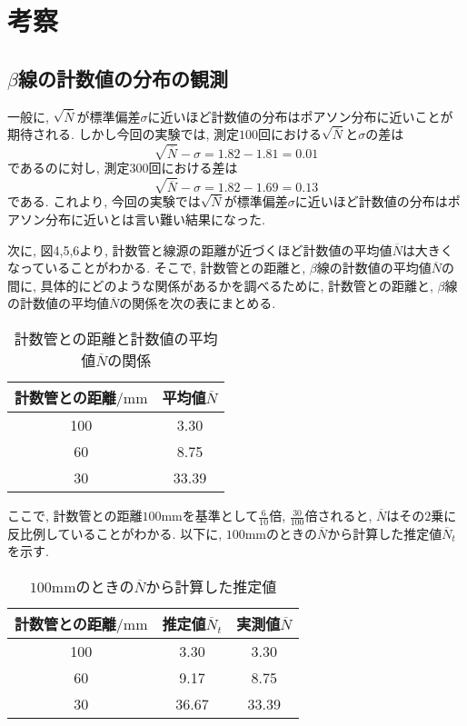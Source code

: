 \documentclass{jarticle}
\begin{document}
\section{考察}


\subsection{$\beta$線の計数値の分布の観測}

一般に, $\sqrt{\overline{N}}$が標準偏差$\sigma$に近いほど計数値の分布はポアソン分布に近いことが期待される.
しかし今回の実験では, 測定$100$回における$\sqrt{\overline{N}}$と$\sigma$の差は
\begin{equation}
  \sqrt{\overline{N}} - \sigma = 1.82 - 1.81 = 0.01
\end{equation}
であるのに対し, 測定$300$回における差は
\begin{equation}
  \sqrt{\overline{N}} - \sigma = 1.82 - 1.69 = 0.13
\end{equation}
である.
これより, 今回の実験では$\sqrt{\overline{N}}$が標準偏差$\sigma$に近いほど計数値の分布はポアソン分布に近いとは言い難い結果になった.

次に, 図4,5,6より, 計数管と線源の距離が近づくほど計数値の平均値$\overline{N}$は大きくなっていることがわかる.
そこで, 計数管との距離と, $\beta$線の計数値の平均値$\overline{N}$の間に, 具体的にどのような関係があるかを調べるために, 計数管との距離と, $\beta$線の計数値の平均値$\overline{N}$の関係を次の表にまとめる.

\begin{table}[H]
  \centering
  \caption{計数管との距離と計数値の平均値$\overline{N}$の関係}
  \label{tb:N-and-distance}
  \begin{tabular}{cc}
    \hline
    計数管との距離$/\mathrm{mm}$ & 平均値$\overline{N}$ \\
    \hline
    100 & 3.30 \\
    60 & 8.75 \\
    30 & 33.39 \\
    \hline
  \end{tabular}
\end{table}

ここで, 計数管との距離$100\mathrm{mm}$を基準として$\frac{6}{10}$倍, $\frac{30}{100}$倍されると, $\overline{N}$はその$2$乗に反比例していることがわかる.
以下に, $100\mathrm{mm}$のときの$\overline{N}$から計算した推定値$\overline{N}_t$を示す.

\begin{table}[H]
  \centering
  \caption{$100\mathrm{mm}$のときの$\overline{N}$から計算した推定値}
  \label{tb:N-and-distance-estimation}
  \begin{tabular}{ccc}
    \hline
    計数管との距離$/\mathrm{mm}$ & 推定値$\overline{N}_t$ & 実測値$\overline{N}$ \\
    \hline
    100 & 3.30 & 3.30 \\
    60 & 9.17 & 8.75 \\
    30 & 36.67 & 33.39 \\
    \hline
  \end{tabular}
\end{table}
\end{document}
